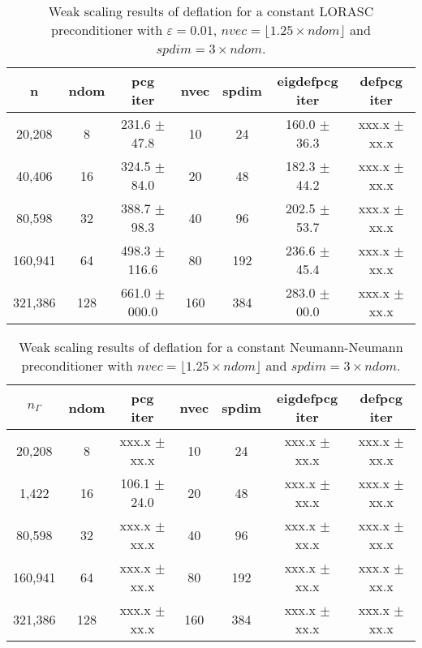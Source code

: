 \documentclass{article}
\begin{document}
\begin{table}[ht]
	\caption{Weak scaling results of deflation for a constant LORASC preconditioner with $\varepsilon=0.01$, $nvec=\lfloor1.25\times ndom\rfloor$ and $spdim=3\times ndom$.}
	\centering
	\begin{tabular}{|c|c|c|c|c|c|c|}
	\hline
	n & ndom & \makecell{pcg\\ iter} & nvec & spdim & \makecell{eigdefpcg\\ iter} & \makecell{defpcg\\ iter}\\
	\hline
	20,208  &   8 & 231.6 $\pm$  47.8 &  10 &  24 & 160.0 $\pm$ 36.3 & xxx.x $\pm$ xx.x \\
	40,406  &  16 & 324.5 $\pm$  84.0 &  20 &  48 & 182.3 $\pm$ 44.2 & xxx.x $\pm$ xx.x \\
	80,598  &  32 & 388.7 $\pm$  98.3 &  40 &  96 & 202.5 $\pm$ 53.7 & xxx.x $\pm$ xx.x \\
	160,941 &  64 & 498.3 $\pm$ 116.6 &  80 & 192 & 236.6 $\pm$ 45.4 & xxx.x $\pm$ xx.x \\
	321,386 & 128 & 661.0 $\pm$ 000.0 & 160 & 384 & 283.0 $\pm$ 00.0 & xxx.x $\pm$ xx.x \\
	\hline
\end{tabular}
	\label{Tab:015}
\end{table}



\begin{table}[ht]
	\caption{Weak scaling results of deflation for a constant Neumann-Neumann preconditioner with $nvec=\lfloor1.25\times ndom\rfloor$ and $spdim=3\times ndom$.}
	\centering
	\begin{tabular}{|c|c|c|c|c|c|c|}
	\hline
	$n_\Gamma$ & ndom & \makecell{pcg\\ iter} & nvec & spdim & \makecell{eigdefpcg\\ iter} & \makecell{defpcg\\ iter}\\
	\hline
	20,208  &   8 & xxx.x $\pm$  xx.x &  10 &  24 & xxx.x $\pm$ xx.x & xxx.x $\pm$ xx.x \\
	1,422  &  16 & 106.1 $\pm$  24.0 &  20 &  48 & xxx.x $\pm$ xx.x & xxx.x $\pm$ xx.x \\
	80,598  &  32 & xxx.x $\pm$  xx.x &  40 &  96 & xxx.x $\pm$ xx.x & xxx.x $\pm$ xx.x \\
	160,941 &  64 & xxx.x $\pm$  xx.x &  80 & 192 & xxx.x $\pm$ xx.x & xxx.x $\pm$ xx.x \\
	321,386 & 128 & xxx.x $\pm$  xx.x & 160 & 384 & xxx.x $\pm$ xx.x & xxx.x $\pm$ xx.x \\
	\hline
    \end{tabular}
	\label{Tab:025}
\end{table}
\end{document}
